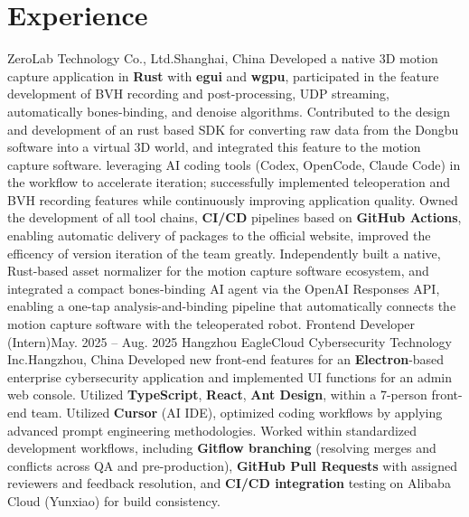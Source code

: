 
\section{Experience}
\resumeSubHeadingListStart
{ZeroLab Technology Co., Ltd.}{Shanghai, China}
\resumeItemListStart
\resumeItem
{
	Developed a native 3D motion capture application in \textbf{Rust} with \textbf{egui} and \textbf{wgpu},
	participated in the feature development of BVH recording and post-processing, UDP streaming,
	automatically bones-binding, and denoise algorithms.
}
\resumeItem
{
	Contributed to the design and development of an rust based SDK for converting raw data from
	the Dongbu software into a virtual 3D world, and integrated this feature to the
	motion capture software.
}
\resumeItem
{
	leveraging AI coding tools (Codex, OpenCode, Claude Code) in the workflow to accelerate iteration;
	successfully implemented teleoperation and BVH recording features while continuously improving application quality.
}
\resumeItem
{
	Owned the development of all tool chains,
	\textbf{CI/CD} pipelines based on \textbf{GitHub Actions},
	enabling automatic delivery of packages to the official website,
	improved the efficency of version iteration of the team greatly.
}
\resumeItem
{
	Independently built a native, Rust-based asset normalizer for the motion capture software ecosystem,
	and integrated a compact bones-binding AI agent via the OpenAI Responses API,
	enabling a one-tap analysis-and-binding pipeline that automatically connects the motion capture software with the teleoperated robot.
}
\resumeItemListEnd
\resumeSubheading
{Frontend Developer (Intern)}{May. 2025 -- Aug. 2025}
{Hangzhou EagleCloud Cybersecurity Technology Inc.}{Hangzhou, China}
\resumeItemListStart
\resumeItem
{
	Developed new front-end features for an \textbf{Electron}-based enterprise cybersecurity application
	and implemented UI functions for an admin web console.
	Utilized \textbf{TypeScript}, \textbf{React}, \textbf{Ant Design}, within a 7-person front-end team.
}
\resumeItem
{
	Utilized \textbf{Cursor} (AI IDE), optimized coding workflows by
	applying advanced prompt engineering methodologies.
}
\resumeItem
{
	Worked within standardized development workflows, including \textbf{Gitflow branching}
	(resolving merges and conflicts across QA and pre-production),
	\textbf{GitHub Pull Requests} with assigned reviewers and feedback resolution,
	and \textbf{CI/CD integration} testing on Alibaba Cloud (Yunxiao) for build consistency.
}
\resumeItemListEnd
\resumeSubHeadingListEnd
